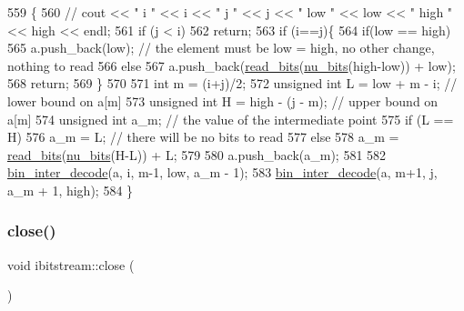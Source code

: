 \begin{DoxyCode}
559                                                                                 \{
560   \textcolor{comment}{// cout << " i " << i << " j " << j << " low " << low << " high " << high << endl;}
561   \textcolor{keywordflow}{if} (j < i)
562     \textcolor{keywordflow}{return};
563   \textcolor{keywordflow}{if} (i==j)\{
564     \textcolor{keywordflow}{if}(low == high)
565       a.push\_back(low); \textcolor{comment}{// the element must be low = high, no other change, nothing to read}
566     \textcolor{keywordflow}{else}
567       a.push\_back(\hyperlink{classibitstream_a2fdcaecf10fefa6942dcd5286a2696e0}{read\_bits}(\hyperlink{bitstream_8cpp_a9dfce6f51e3febb3973aa3b16c2fecb4}{nu\_bits}(high-low)) + low);
568     \textcolor{keywordflow}{return};
569   \}
570 
571   \textcolor{keywordtype}{int} m = (i+j)/2;
572   \textcolor{keywordtype}{unsigned} \textcolor{keywordtype}{int} L = low + m - i; \textcolor{comment}{// lower bound on a[m]}
573   \textcolor{keywordtype}{unsigned} \textcolor{keywordtype}{int} H = high - (j - m); \textcolor{comment}{// upper bound on a[m]}
574   \textcolor{keywordtype}{unsigned} \textcolor{keywordtype}{int} a\_m; \textcolor{comment}{// the value of the intermediate point}
575   \textcolor{keywordflow}{if} (L == H)
576     a\_m = L; \textcolor{comment}{// there will be no bits to read}
577   \textcolor{keywordflow}{else}
578     a\_m = \hyperlink{classibitstream_a2fdcaecf10fefa6942dcd5286a2696e0}{read\_bits}(\hyperlink{bitstream_8cpp_a9dfce6f51e3febb3973aa3b16c2fecb4}{nu\_bits}(H-L)) + L;
579   
580   a.push\_back(a\_m);
581 
582   \hyperlink{classibitstream_a4d1bfd02f98f6af2ac4d80034b23e26d}{bin\_inter\_decode}(a, i, m-1, low, a\_m - 1);
583   \hyperlink{classibitstream_a4d1bfd02f98f6af2ac4d80034b23e26d}{bin\_inter\_decode}(a, m+1, j, a\_m + 1, high);
584 \}
\end{DoxyCode}
\mbox{\label{classibitstream_aa7b59600e58571b802d6d0dadf92d37a}} 
\subsubsection{\texorpdfstring{close()}{close()}}
{\footnotesize\ttfamily void ibitstream\+::close (\begin{DoxyParamCaption}{ }\end{DoxyParamCaption})\hspace{0.3cm}{\ttfamily [inline]}}



